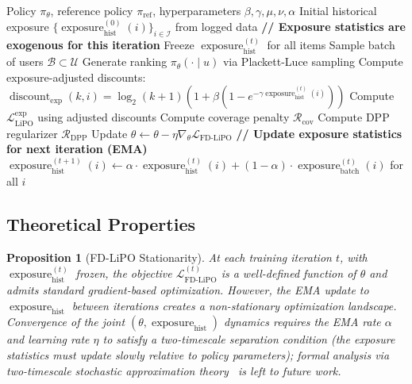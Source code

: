 \documentclass[11pt,a4paper]{article}
\theoremstyle{definition}
\theoremstyle{plain}
\newtheorem{proposition}[theorem]{Proposition}
\theoremstyle{remark}
\DeclareMathOperator{\discount}{discount}
\DeclareMathOperator{\exposure}{exposure}
\begin{document}
\begin{algorithm}[H]
\caption{Fair Diverse LiPO Training}
\label{alg:fd_lipo}
\begin{algorithmic}[1]
\Require Policy $\pi_\theta$, reference policy $\pi_{\text{ref}}$, hyperparameters $\beta, \gamma, \mu, \nu, \alpha$
\Require Initial historical exposure $\{\exposure_{\text{hist}}^{(0)}(i)\}_{i \in \mathcal{I}}$ from logged data
    \State \textbf{// Exposure statistics are exogenous for this iteration}
    \State Freeze $\exposure_{\text{hist}}^{(t)}$ for all items
    \State Sample batch of users $\mathcal{B} \subset \mathcal{U}$
        \State Generate ranking $\pi_\theta(\cdot \mid u)$ via Plackett-Luce sampling
        \State Compute exposure-adjusted discounts: $\discount_{\text{exp}}(k, i) = \log_2(k+1)(1 + \beta (1 - e^{-\gamma \exposure_{\text{hist}}^{(t)}(i)}))$
        \State Compute $\mathcal{L}_{\text{LiPO}}^{\text{exp}}$ using adjusted discounts
        \State Compute coverage penalty $\mathcal{R}_{\text{cov}}$
        \State Compute DPP regularizer $\mathcal{R}_{\text{DPP}}$
    \EndFor
    \State Update $\theta \leftarrow \theta - \eta \nabla_\theta \mathcal{L}_{\text{FD-LiPO}}$
    \State \textbf{// Update exposure statistics for next iteration (EMA)}
    \State $\exposure_{\text{hist}}^{(t+1)}(i) \leftarrow \alpha \cdot \exposure_{\text{hist}}^{(t)}(i) + (1-\alpha) \cdot \exposure_{\text{batch}}^{(t)}(i)$ for all $i$
\EndFor
\end{algorithmic}
\end{algorithm}

\subsection{Theoretical Properties}
\label{subsec:properties}

\begin{proposition}[FD-LiPO Stationarity]
\label{prop:convergence}
At each training iteration $t$, with $\exposure_{\text{hist}}^{(t)}$ frozen, the objective $\mathcal{L}_{\text{FD-LiPO}}^{(t)}$ is a well-defined function of $\theta$ and admits standard gradient-based optimization. However, the EMA update to $\exposure_{\text{hist}}$ between iterations creates a non-stationary optimization landscape. Convergence of the joint $(\theta, \exposure_{\text{hist}})$ dynamics requires the EMA rate $\alpha$ and learning rate $\eta$ to satisfy a two-timescale separation condition (the exposure statistics must update slowly relative to policy parameters); formal analysis via two-timescale stochastic approximation theory~\cite{borkar2008} is left to future work.
\end{proposition}
\end{document}
